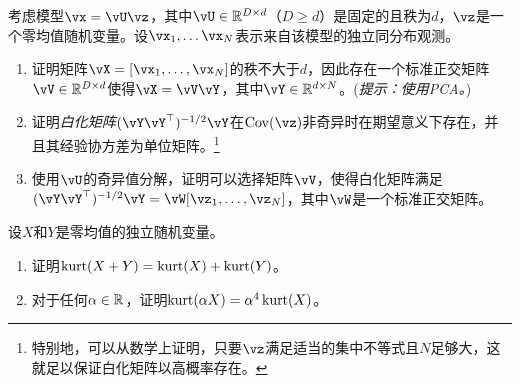\documentclass[../../book-main.tex]{subfiles}
\begin{document}
\begin{exercise}\label{exercise:whitening}
    考虑模型$\vx = \vU \vz$，其中$\vU \in \R^{D \times d}$（$D \geq d$）是固定的且秩为$d$，$\vz$是一个零均值随机变量。设$\vx_1, \dots \vx_N$表示来自该模型的独立同分布观测。
    \begin{enumerate}
        \item 证明矩阵$\vX = [\vx_1, \dots, \vx_N]$的秩不大于$d$，因此存在一个标准正交矩阵$\vV \in \R^{D \times d}$使得$\vX = \vV \vY$，其中$\vY \in \R^{d \times N}$。(\textit{提示：使用PCA。})
        \item 证明\textit{白化矩阵}$(\vY \vY^\top)^{-1/2}\vY$在$\Cov(\vz)$非奇异时在期望意义下存在，并且其经验协方差为单位矩阵。\footnote{特别地，可以从数学上证明，只要$\vz$满足适当的集中不等式且$N$足够大，这就足以保证白化矩阵以高概率存在。}
        \item 使用$\vU$的奇异值分解，证明可以选择矩阵$\vV$，使得白化矩阵满足$(\vY \vY^\top)^{-1/2} \vY = \vW [\vz_1, \dots, \vz_N]$，其中$\vW$是一个标准正交矩阵。
    \end{enumerate}
\end{exercise}

\begin{exercise}\label{exercise:kurtosis-linearity-properties}
    设$X$和$Y$是零均值的独立随机变量。
    \begin{enumerate}
        \item 证明$\mathop{\mathrm{kurt}}(X + Y) = \mathop{\mathrm{kurt}}(X) + \mathop{\mathrm{kurt}}(Y)$。
        \item 对于任何$\alpha \in \mathbb{R}$，证明$\mathop{\mathrm{kurt}}(\alpha X) = \alpha^4 \mathop{\mathrm{kurt}}(X)$。
    \end{enumerate}
\end{exercise}
\end{document}
